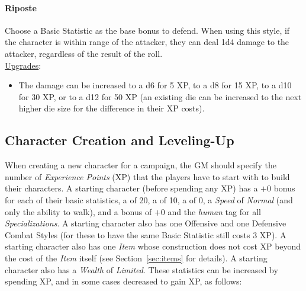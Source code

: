 \paragraph{Riposte}
Choose a Basic Statistic as the base bonus to defend.
When using this style, if the character is within range of the attacker, they can deal 1d4 damage to the attacker, regardless of the result of the roll.
\\
\underline{Upgrades}:
\begin{itemize}
  \item[-] The damage can be increased to a d6 for 5 XP, to a d8 for 15 XP, to a d10 for 30 XP, or to a d12 for 50 XP (an existing die can be increased to the next higher die size for the difference in their XP costs).
\end{itemize}

\subsection{Character Creation and Leveling-Up}
When creating a new character for a campaign, the GM should specify the number of \emph{Experience Points} (XP) that the players have to start with to build their characters.
A starting character (before spending any XP) has a $+0$ bonus for each of their basic statistics, a \Life{} of 20, a \Recovery{} of 10, a \Block{} of 0, a \emph{Speed} of \emph{Normal} (and only the ability to walk), and a bonus of $+0$ and the \emph{human} tag for all \emph{Specializations}.
A starting character also has one Offensive and one Defensive Combat Styles (for these to have the same Basic Statistic still costs 3 XP). 
A starting character also has one \emph{Item} whose construction does not cost XP beyond the cost of the \emph{Item} itself (see Section~\ref{sec:items} for details).
A starting character also has a \emph{Wealth} of \emph{Limited}.
These statistics can be increased by spending XP, and in some cases decreased to gain XP, as follows:
